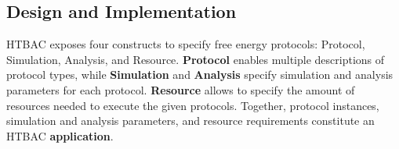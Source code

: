 



\subsection{Design and Implementation}\label{ssec:design_arch}

HTBAC exposes four constructs to specify free energy protocols: Protocol,
Simulation, Analysis, and Resource. \textbf{Protocol} enables multiple
descriptions of protocol types, while \textbf{Simulation} and
\textbf{Analysis} specify simulation and analysis parameters for each
protocol. \textbf{Resource} allows to specify the amount of resources needed
to execute the given protocols.
Together, protocol instances, simulation and analysis parameters, and
resource requirements constitute an HTBAC \textbf{application}.




